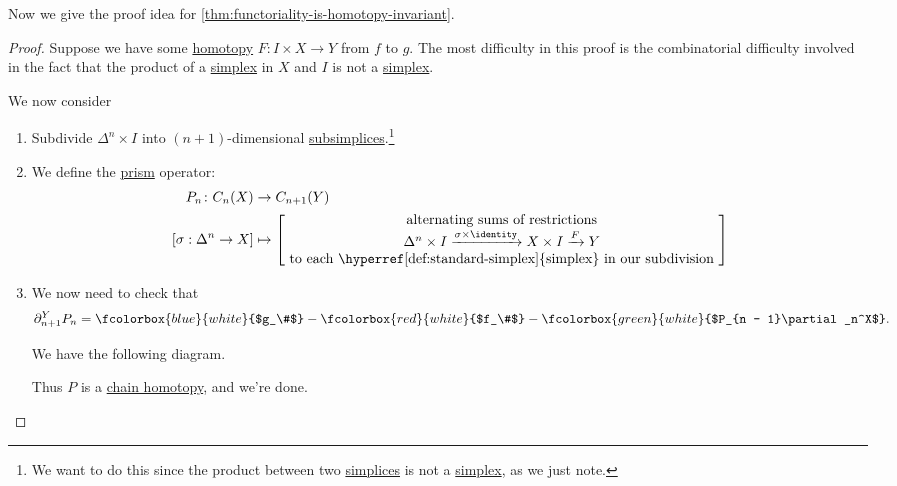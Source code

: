 Now we give the proof idea for \autoref{thm:functoriality-is-homotopy-invariant}.
\begin{proof}\label{pf:functoriality-is-homotopy-invariant}
	Suppose we have some \hyperref[def:homotopy]{homotopy} $F \colon I \times X \to Y$ from $f$ to $g$. The most difficulty in this proof is the
	combinatorial difficulty involved in the fact that the product of a \hyperref[def:standard-simplex]{simplex} in $X$ and $I$ is not a \hyperref[def:standard-simplex]{simplex}.

	We now consider
	\begin{enumerate}
		\item Subdivide $\Delta^n \times I$ into $(n + 1)$-dimensional \hyperref[def:subsimplex]{subsimplices}.\footnote{We want to do this since the product between two \hyperref[def:standard-simplex]{simplices} is not a \hyperref[def:standard-simplex]{simplex}, as we just note.}
		      \begin{figure}[H]
			      \centering
			      \label{fig:pf:functoriality-is-homotopy-invariant}
		      \end{figure}
		\item We define the \underline{prism} operator:
		      \begin{align*}
			      P_n \colon C_n(X)         & \to C_{n + 1}(Y)                                                                                              \\
			      [\sigma : \Delta^n \to X] & \mapsto \begin{bmatrix} \text{ alternating sums of restrictions }                                             \\
				                                          \Delta^n \times I \xrightarrow{\sigma \times \identity } X \times I \xrightarrow{F} Y \\
				                                          \text{ to each \hyperref[def:standard-simplex]{simplex} in our subdivision }
			                                          \end{bmatrix}
		      \end{align*}
		\item We now need to check that
		      \[
			      \partial_{n + 1}^YP_n = \fcolorbox{blue}{white}{$g_\#$} - \fcolorbox{red}{white}{$f_\#$} - \fcolorbox{green}{white}{$P_{n - 1}\partial_n^X$}.
		      \]

		      We have the following diagram.
		      \begin{figure}[H]
			      \centering
			      \label{fig:pf:functoriality-is-homotopy-invariant-2}
		      \end{figure}
		      Thus $P$ is a \hyperref[def:chain-homotopy]{chain homotopy}, and we're done.
	\end{enumerate}
\end{proof}